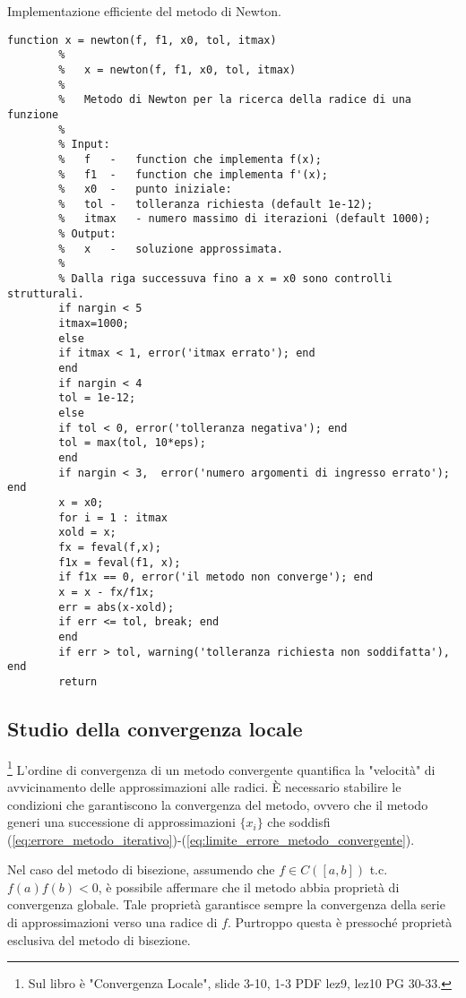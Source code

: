 \begin{algorithm}
	\caption{Implementazione efficiente del metodo di Newton.}\label{alg:metodo_newton}
	\begin{lstlisting}[style=Matlab-editor]
		function x = newton(f, f1, x0, tol, itmax)
		%   
		%   x = newton(f, f1, x0, tol, itmax)
		%
		%   Metodo di Newton per la ricerca della radice di una funzione
		%
		% Input:
		%   f   -   function che implementa f(x);
		%   f1  -   function che implementa f'(x);
		%   x0  -   punto iniziale:
		%   tol -   tolleranza richiesta (default 1e-12);
		%   itmax   - numero massimo di iterazioni (default 1000);
		% Output:
		%   x   -   soluzione approssimata.
		%
		% Dalla riga successuva fino a x = x0 sono controlli strutturali.
		if nargin < 5
		itmax=1000;
		else
		if itmax < 1, error('itmax errato'); end
		end
		if nargin < 4 
		tol = 1e-12;
		else
		if tol < 0, error('tolleranza negativa'); end
		tol = max(tol, 10*eps);
		end
		if nargin < 3,  error('numero argomenti di ingresso errato'); end
		x = x0;
		for i = 1 : itmax
		xold = x;
		fx = feval(f,x);
		f1x = feval(f1, x);
		if f1x == 0, error('il metodo non converge'); end
		x = x - fx/f1x;
		err = abs(x-xold);
		if err <= tol, break; end
		end
		if err > tol, warning('tolleranza richiesta non soddifatta'), end
		return
	\end{lstlisting}
\end{algorithm}

\subsection{Studio della convergenza locale}\footnote{Sul libro è "Convergenza Locale", slide 3-10, 1-3 PDF lez9, lez10 PG 30-33.} 
L'ordine di convergenza di un metodo convergente quantifica la "velocità" di avvicinamento delle approssimazioni alle radici. È necessario stabilire le condizioni che garantiscono la convergenza del metodo, ovvero che il metodo generi una successione di approssimazioni $\{x_i\}$ che soddisfi (\ref{eq:errore_metodo_iterativo})-(\ref{eq:limite_errore_metodo_convergente}).

Nel caso del metodo di bisezione, assumendo che $f\in C([a,b])$ t.c. $f(a)f(b)<0$, è possibile affermare che il metodo abbia proprietà di convergenza globale. Tale proprietà garantisce sempre la convergenza della serie di approssimazioni verso una radice di $f$. Purtroppo questa è pressoché proprietà esclusiva del metodo di bisezione.

